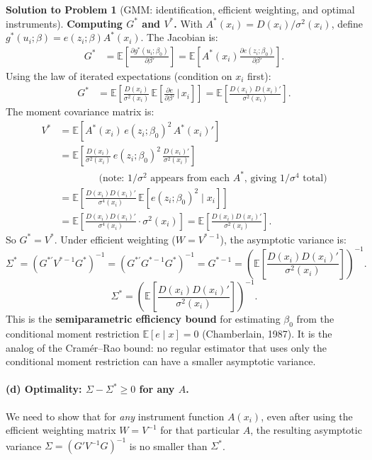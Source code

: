 \documentclass[12pt]{article}
\newcommand{\E}{\mathbb E}
\theoremstyle{definition}
\newtheorem{solution}{Solution to Problem}
\begin{document}
\begin{solution}[GMM: identification, efficient weighting, and optimal instruments]
\medskip
\noindent\textbf{Computing $G^*$ and $V^*$.} With $A^*(x_i)=D(x_i)/\sigma^2(x_i)$, define $g^*(u_i;\beta)=e(z_i;\beta)A^*(x_i)$. The Jacobian is:
\begin{align*}
G^* &= \E\!\left[\frac{\partial g^*(u_i;\beta_0)}{\partial\beta'}\right] = \E\!\left[A^*(x_i)\frac{\partial e(z_i;\beta_0)}{\partial\beta'}\right].
\end{align*}
Using the law of iterated expectations (condition on $x_i$ first):
\begin{align*}
G^* &= \E\!\left[\frac{D(x_i)}{\sigma^2(x_i)}\,\E\!\left[\frac{\partial e}{\partial\beta'}\,\bigg|\,x_i\right]\right] = \E\!\left[\frac{D(x_i)\,D(x_i)'}{\sigma^2(x_i)}\right].
\end{align*}
The moment covariance matrix is:
\begin{align*}
V^* &= \E\!\left[A^*(x_i)\,e(z_i;\beta_0)^2\,A^*(x_i)'\right] \\
&= \E\!\left[\frac{D(x_i)}{\sigma^2(x_i)}\,e(z_i;\beta_0)^2\,\frac{D(x_i)'}{\sigma^2(x_i)}\right] \\
&\qquad\qquad\text{(note: $1/\sigma^2$ appears from each $A^*$, giving $1/\sigma^4$ total)}\\
&= \E\!\left[\frac{D(x_i)D(x_i)'}{\sigma^4(x_i)}\,\E[e(z_i;\beta_0)^2\mid x_i]\right] \\
&= \E\!\left[\frac{D(x_i)D(x_i)'}{\sigma^4(x_i)}\cdot\sigma^2(x_i)\right] = \E\!\left[\frac{D(x_i)D(x_i)'}{\sigma^2(x_i)}\right].
\end{align*}
So $G^*=V^*$. Under efficient weighting ($W=V^{*-1}$), the asymptotic variance is:
\[
\Sigma^* = (G^{*\prime}V^{*-1}G^*)^{-1} = (G^{*\prime}G^{*-1}G^*)^{-1} = G^{*-1} = \left(\E\!\left[\frac{D(x_i)D(x_i)'}{\sigma^2(x_i)}\right]\right)^{-1}.
\]
\[
\boxed{\Sigma^* = \left(\E\!\left[\frac{D(x_i)D(x_i)'}{\sigma^2(x_i)}\right]\right)^{-1}.}
\]
This is the \textbf{semiparametric efficiency bound} for estimating $\beta_0$ from the conditional moment restriction $\E[e\mid x]=0$ (Chamberlain, 1987). It is the analog of the Cramér--Rao bound: no regular estimator that uses only the conditional moment restriction can have a smaller asymptotic variance.

\bigskip
\paragraph{(d) Optimality: $\Sigma-\Sigma^*\geq 0$ for any $A$.} We need to show that for \emph{any} instrument function $A(x_i)$, even after using the efficient weighting matrix $W=V^{-1}$ for that particular $A$, the resulting asymptotic variance $\Sigma=(G'V^{-1}G)^{-1}$ is no smaller than $\Sigma^*$.


\end{solution}
\end{document}
